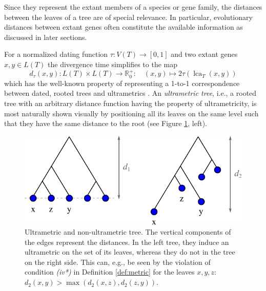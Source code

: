 \documentclass[hidelinks,11pt]{scrreprt}
\DeclareMathOperator{\lca}{lca}
\begin{document}
Since they represent the extant members of a species or gene family, the distances between the leaves of a tree are of special relevance. In particular, evolutionary distances between extant genes often constitute the available information as discussed in later sections.

For a normalized dating function $\tau: V(T) \rightarrow [0,1]$ and two extant genes $x,y \in L(T)$ the divergence time simplifies to the map
\begin{equation}
d_\tau(x,y) \colon L(T) \times L(T) \to \mathbb{R}_0^+ \colon \quad (x,y) \mapsto 2 \tau(\lca_T(x,y))
\end{equation}
which has the well-known property of representing a 1-to-1 correspondence between dated, rooted trees and ultrametrics \citep[cf.][]{gordon1987,bocker1998}. An \emph{ultrametric tree}, i.e., a rooted tree with an arbitrary distance function having the property of ultrametricity, is most naturally shown visually by positioning all its leaves on the same level such that they have the same distance to the root (see Figure \ref{fig:ultrametric_tree}, left).

\begin{figure}[ht]
	\begin{center}     
		\includegraphics[width=0.65\columnwidth]{ultrametric_tree.pdf}
	\end{center}
	\caption[Ultrametric and non-ultrametric tree]{Ultrametric and non-ultrametric tree. The vertical components of the edges represent the distances. In the left tree, they induce an ultrametric on the set of its leaves, whereas they do not in the tree on the right side. This can, e.g., be seen by the violation of condition \textit{(iv*)} in Definition \ref{def:metric} for the leaves $x,y,z$: $d_2(x,y) > \max(d_2(x,z),d_2(z,y))$.}
	\label{fig:ultrametric_tree}
\end{figure}
\end{document}
